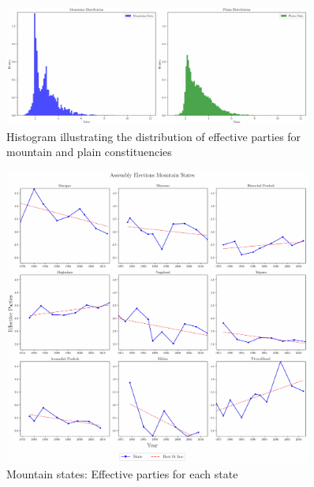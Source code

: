 \begin{figure}[htbp]
    \centering
    \includegraphics[width=0.9\textwidth]{figures/assembly/histogram.pdf}
    \caption{Histogram illustrating the distribution of effective parties for mountain and plain constituencies}
    \label{img:assembly_histogram}
\end{figure}

\begin{figure}[htbp]
    \centering
    \includegraphics[width=0.9\textwidth]{figures/assembly/assembly_elections_mountain_states.pdf}
    \caption{Mountain states: Effective parties for each state}
    \label{img:assembly_mountain_enp}
\end{figure}

